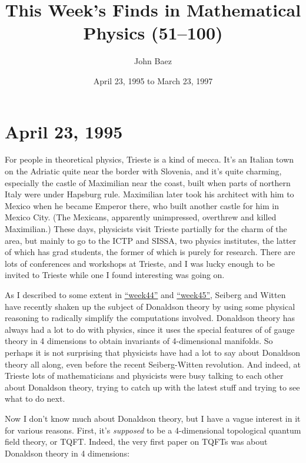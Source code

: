 \documentclass{article}
\title{This Week's Finds in Mathematical Physics (51--100)}
\author{John Baez}
\date{April 23, 1995 to March 23, 1997}
\begin{document}
\hypersetup{linkcolor=myrefcolor,citecolor=mycitecolor,urlcolor=myurlcolor}

\maketitle
\tableofcontents

\hypertarget{week51}{%
\section{April 23, 1995}\label{week51}}

For people in theoretical physics, Trieste is a kind of mecca. It's an
Italian town on the Adriatic quite near the border with Slovenia, and
it's quite charming, especially the castle of Maximilian near the coast,
built when parts of northern Italy were under Hapsburg rule. Maximilian
later took his architect with him to Mexico when he became Emperor
there, who built another castle for him in Mexico City. (The Mexicans,
apparently unimpressed, overthrew and killed Maximilian.) These days,
physicists visit Trieste partially for the charm of the area, but mainly
to go to the ICTP and SISSA, two physics institutes, the latter of which
has grad students, the former of which is purely for research. There are
lots of conferences and workshops at Trieste, and I was lucky enough to
be invited to Trieste while one I found interesting was going on.

As I described to some extent in \protect\hyperlink{week44}{``week44''}
and \protect\hyperlink{week45}{``week45''}, Seiberg and Witten have
recently shaken up the subject of Donaldson theory by using some
physical reasoning to radically simplify the computations involved.
Donaldson theory has always had a lot to do with physics, since it uses
the special features of of gauge theory in 4 dimensions to obtain
invariants of 4-dimensional manifolds. So perhaps it is not surprising
that physicists have had a lot to say about Donaldson theory all along,
even before the recent Seiberg-Witten revolution. And indeed, at Trieste
lots of mathematicians and physicists were busy talking to each other
about Donaldson theory, trying to catch up with the latest stuff and
trying to see what to do next.

Now I don't know much about Donaldson theory, but I have a vague
interest in it for various reasons. First, it's \emph{supposed} to be a
4-dimensional topological quantum field theory, or TQFT. Indeed, the
very first paper on TQFTs was about Donaldson theory in 4 dimensions:
\end{document}

